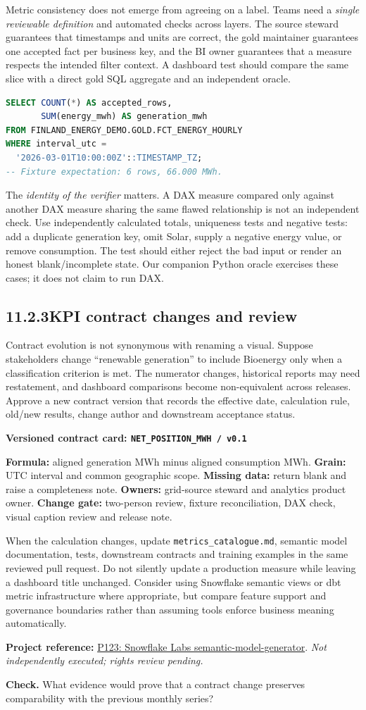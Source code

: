 \documentclass[11pt,twoside]{article}
\newcommand{\topic}[2]{\subsection*{#1\quad #2}}
\newcommand{\repo}[2]{\par\begingroup\fontsize{8.0}{9.6}\selectfont\sffamily\color{inkgray}\textbf{Project reference:} \href{#2}{#1}. \textit{Not independently executed; rights review pending.}\par\endgroup}
\begin{document}
Metric consistency does not emerge from agreeing on a label. Teams need a \emph{single reviewable definition} and automated checks across layers. The source steward guarantees that timestamps and units are correct, the gold maintainer guarantees one accepted fact per business key, and the BI owner guarantees that a measure respects the intended filter context. A dashboard test should compare the same slice with a direct gold SQL aggregate and an independent oracle.
\begin{lstlisting}[language=SQL,caption={Fixture reconciliation query; illustrative Snowflake relation name.}]
SELECT COUNT(*) AS accepted_rows,
       SUM(energy_mwh) AS generation_mwh
FROM FINLAND_ENERGY_DEMO.GOLD.FCT_ENERGY_HOURLY
WHERE interval_utc =
  '2026-03-01T10:00:00Z'::TIMESTAMP_TZ;
-- Fixture expectation: 6 rows, 66.000 MWh.
\end{lstlisting}
The \emph{identity of the verifier} matters. A DAX measure compared only against another DAX measure sharing the same flawed relationship is not an independent check. Use independently calculated totals, uniqueness tests and negative tests: add a duplicate generation key, omit Solar, supply a negative energy value, or remove consumption. The test should either reject the bad input or render an honest blank/incomplete state. Our companion Python oracle exercises these cases; it does not claim to run DAX.
\topic{11.2.3}{KPI contract changes and review}
Contract evolution is not synonymous with renaming a visual. Suppose stakeholders change ``renewable generation'' to include Bioenergy only when a classification criterion is met. The numerator changes, historical reports may need restatement, and dashboard comparisons become non-equivalent across releases. Approve a new contract version that records the effective date, calculation rule, old/new results, change author and downstream acceptance status.
\begin{whitebox}\textbf{Versioned contract card: \texttt{NET\_POSITION\_MWH / v0.1}}\par
\textbf{Formula:} aligned generation MWh minus aligned consumption MWh. \textbf{Grain:} UTC interval and common geographic scope. \textbf{Missing data:} return blank and raise a completeness note. \textbf{Owners:} grid-source steward and analytics product owner. \textbf{Change gate:} two-person review, fixture reconciliation, DAX check, visual caption review and release note.\end{whitebox}
When the calculation changes, update \texttt{metrics\_catalogue.md}, semantic model documentation, tests, downstream contracts and training examples in the same reviewed pull request. Do not silently update a production measure while leaving a dashboard title unchanged. Consider using Snowflake semantic views or dbt metric infrastructure where appropriate, but compare feature support and governance boundaries rather than assuming tools enforce business meaning automatically.
\repo{P123: Snowflake Labs semantic-model-generator}{https://github.com/Snowflake-Labs/semantic-model-generator}
\textbf{Check.} What evidence would prove that a contract change preserves comparability with the previous monthly series?
\newpage
\end{document}

